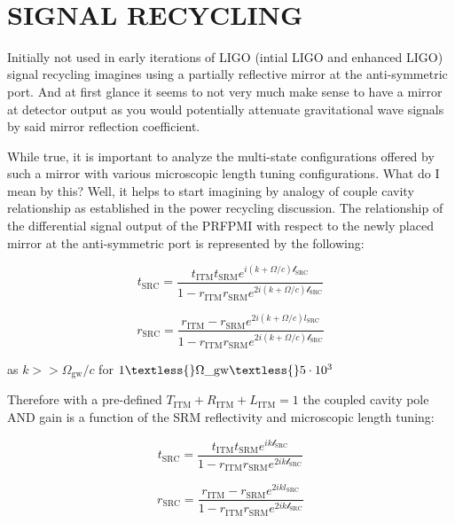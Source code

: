 \documentclass[11pt]{article}
\begin{document}
    \begin{center}
    \end{center}
    { \hspace*{\fill} \\}
    
    \hypertarget{signal-recycling}{%
\section{SIGNAL RECYCLING}\label{signal-recycling}}

    Initially not used in early iterations of LIGO (intial LIGO and enhanced
LIGO) signal recycling imagines using a partially reflective mirror at
the anti-symmetric port. And at first glance it seems to not very much
make sense to have a mirror at detector output as you would potentially
attenuate gravitational wave signals by said mirror reflection
coefficient.

While true, it is important to analyze the multi-state configurations
offered by such a mirror with various microscopic length tuning
configurations. What do I mean by this? Well, it helps to start
imagining by analogy of couple cavity relationship as established in the
power recycling discussion. The relationship of the differential signal
output of the PRFPMI with respect to the newly placed mirror at the
anti-symmetric port is represented by the following:

\[ t_\mathrm{SRC} = \frac{t_\mathrm{ITM}t_\mathrm{SRM} e^{i  (k + \Omega/c) \mathscr{l}_\mathrm{SRC}}}{1- r_\mathrm{ITM}r_\mathrm{SRM} e^{2i  (k + \Omega/c) \mathscr{l}_\mathrm{SRC}}}\]

\[ r_\mathrm{SRC} = \frac{r_\mathrm{ITM} - r_\mathrm{SRM} e^{2i  (k + \Omega/c) l_\mathrm{SRC}}}{1- r_\mathrm{ITM}r_\mathrm{SRM} e^{2i  (k + \Omega/c) \mathscr{l}_\mathrm{SRC}}}\]

as \(k >> \Omega_\mathrm{gw}/c\) for $1 \textless{}
\Omega\_\mathrm{gw} \textless{} 5 \cdot 10^{3} $

Therefore with a pre-defined
\(T_\mathrm{ITM} + R_\mathrm{ITM} + L_\mathrm{ITM} = 1\) the coupled
cavity pole AND gain is a function of the SRM reflectivity and
microscopic length tuning:

\[ t_\mathrm{SRC} = \frac{t_\mathrm{ITM}t_\mathrm{SRM} e^{i k \mathscr{l}_\mathrm{SRC}}}{1- r_\mathrm{ITM}r_\mathrm{SRM} e^{2i k \mathscr{l}_\mathrm{SRC}}}\]

\[ r_\mathrm{SRC} = \frac{r_\mathrm{ITM} - r_\mathrm{SRM} e^{2i k l_\mathrm{SRC}}}{1- r_\mathrm{ITM}r_\mathrm{SRM} e^{2i k \mathscr{l}_\mathrm{SRC}}}\]
\end{document}
